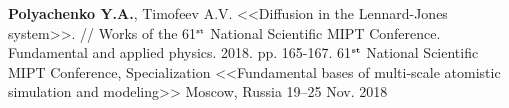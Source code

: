 \begin{cventries}
    
  \cventry
    {\textbf{Polyachenko Y.A.}, Timofeev A.V. <<Diffusion in the Lennard-Jones system>>. // Works of the 61$^{\texttt{\tiny st}}$ National Scientific MIPT Conference. Fundamental and applied physics. 2018. pp. 165-167.} %
    {61$^{\textbf{\tiny st}}$ National Scientific MIPT Conference, Specialization <<Fundamental bases of multi-scale atomistic simulation and modeling>>} %
    {Moscow, Russia} %
    {19--25 Nov. 2018} %
    {
    }
    

\end{cventries}
